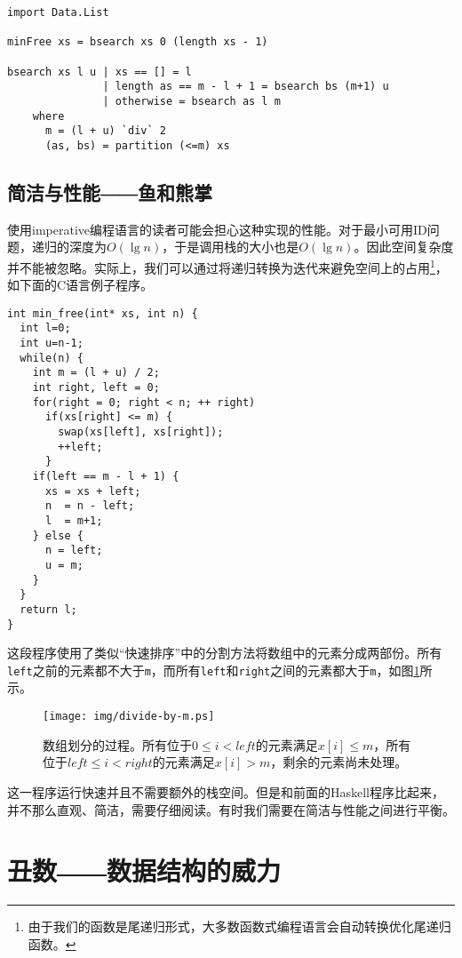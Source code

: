 \documentclass[UTF8]{article}
\begin{document}
\begin{lstlisting}[style=Haskell]
import Data.List

minFree xs = bsearch xs 0 (length xs - 1)

bsearch xs l u | xs == [] = l
               | length as == m - l + 1 = bsearch bs (m+1) u
               | otherwise = bsearch as l m
    where
      m = (l + u) `div` 2
      (as, bs) = partition (<=m) xs
\end{lstlisting}
\lstset{}

\subsection{简洁与性能――鱼和熊掌}
使用imperative编程语言的读者可能会担心这种实现的性能。对于最小可用ID问题，递归的深度为$O(\lg n)$，于是调用栈的大小也是$O(\lg n)$。因此空间复杂度并不能被忽略。实际上，我们可以通过将递归转换为迭代来避免空间上的占用\footnote{由于我们的函数是尾递归形式，大多数函数式编程语言会自动转换优化尾递归函数。}，如下面的C语言例子程序。

\lstset{language=C}
\begin{lstlisting}
int min_free(int* xs, int n) {
  int l=0;
  int u=n-1;
  while(n) {
    int m = (l + u) / 2;
    int right, left = 0;
    for(right = 0; right < n; ++ right)
      if(xs[right] <= m) {
        swap(xs[left], xs[right]);
        ++left;
      }
    if(left == m - l + 1) {
      xs = xs + left;
      n  = n - left;
      l  = m+1;
    } else {
      n = left;
      u = m;
    }
  }
  return l;
}
\end{lstlisting}

这段程序使用了类似“快速排序”中的分割方法将数组中的元素分成两部份。所有\texttt{left}之前的元素都不大于\texttt{m}，而所有\texttt{left}和\texttt{right}之间的元素都大于\texttt{m}，如图\ref{fig:divide}所示。

\begin{figure}[htbp]
  \centering
  \texttt{[image: img/divide-by-m.ps]}
  \caption{数组划分的过程。所有位于$0 \leq i < left$的元素满足$x[i] \leq m$，所有位于$left \leq i < right$的元素满足$x[i] > m$，剩余的元素尚未处理。} \label{fig:divide}
\end{figure}

这一程序运行快速并且不需要额外的栈空间。但是和前面的Haskell程序比起来，并不那么直观、简洁，需要仔细阅读。有时我们需要在简洁与性能之间进行平衡。

\section{丑数――数据结构的威力}
\end{document}
